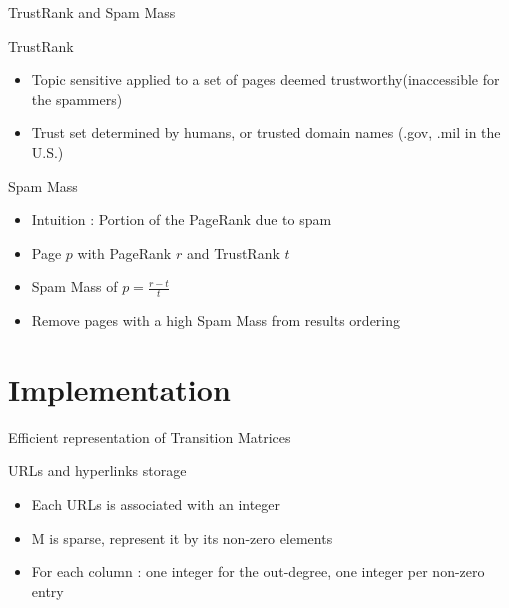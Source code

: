 \documentclass[10pt]{beamer}
\begin{document}
\begin{frame}{TrustRank and Spam Mass}
\begin{block}{TrustRank}
\begin{itemize}
\item Topic sensitive applied to a set of pages deemed trustworthy(inaccessible for the spammers)
\item Trust set determined by humans, or trusted domain names (.gov, .mil in the U.S.)
\end{itemize}
\end{block}
\begin{block}{Spam Mass}
\begin{itemize}
\item Intuition : Portion of the PageRank due to spam
\item Page $p$ with PageRank $r$ and TrustRank $t$
\item Spam Mass of $p = \frac{r-t}{t}$
\item Remove pages with a high Spam Mass from results ordering
\end{itemize}
\end{block}
\end{frame}

\section{Implementation}
\begin{frame}
  \tableofcontents[currentsection]
\end{frame}
\begin{frame}{Efficient representation of Transition Matrices}
  \begin{block}{URLs and hyperlinks storage}
  \begin{itemize}
    \item Each URLs is associated with an integer
    \item M is sparse, represent it by its non-zero elements
    \item For each column : one integer for the out-degree, one integer per non-zero entry
  \end{itemize}
  \end{block}
\end{frame}
\end{document}
